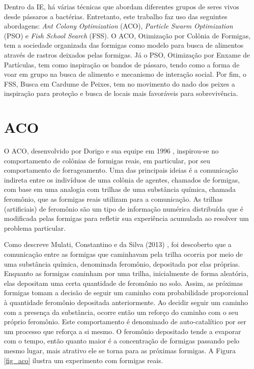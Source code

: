 Dentro da IE, há várias técnicas que abordam diferentes grupos de seres vivos desde pássaros a bactérias. Entretanto, este trabalho faz uso das seguintes abordagens: \textit{ Ant Colony Optimization} (ACO), \textit{Particle Swarm Optimization} (PSO) e \textit{Fish School Search} (FSS). O ACO, Otimização por Colônia de Formigas, tem a sociedade organizada das formigas como modelo para busca de alimentos através de rastros deixados pelas formigas. Já o PSO, Otimização por Enxame de Partículas, tem como inspiração os bandos de pássaro, tendo como a forma de voar em grupo na busca de alimento e mecanismo de interação social. Por fim, o FSS, Busca em Cardume de Peixes, tem no movimento do nado dos peixes a inspiração para proteção e busca de locais mais favoráveis para sobrevivência.

\section{ACO}
\label{sec-aco}

O ACO, desenvolvido por Dorigo e sua equipe em 1996 \cite{dorigo1996any}, inspirou-se no comportamento de colônias de formigas reais, em particular, por seu comportamento de forrageamento. Uma das principais ideias é a comunicação indireta entre os indivíduos de uma colônia de agentes, chamados de formigas, com base em uma analogia com trilhas de uma substância química, chamada feromônio, que as formigas reais utilizam para a comunicação. As trilhas (artificiais) de feromônio são um tipo de informação numérica distribuída que é modificada pelas formigas para refletir sua experiência acumulada ao resolver um problema particular.

Como descreve Mulati, Constantino e da Silva (2013) \cite{mulati2013otimizaccao}, foi descoberto que a comunicação entre as formigas que caminhavam pela trilha ocorria por meio de uma substância química, denominada feromônio, depositada por elas próprias. Enquanto as formigas caminham por uma trilha, inicialmente de forma aleatória, elas depositam uma certa quantidade de feromônio no solo. Assim, as próximas formigas tomam a decisão de seguir um caminho com probabilidade proporcional à quantidade feromônio depositada anteriormente. Ao decidir seguir um caminho com a presença da substância, ocorre então um reforço do caminho com o seu próprio feromônio. Este comportamento é denominado de auto-catalítico por ser um processo que reforça a si mesmo. O feromônio depositado tende a evaporar com o tempo, então quanto maior é a concentração de formigas passando pelo mesmo lugar, mais atrativo ele se torna para as próximas formigas. A Figura \ref{fig_aco} ilustra um experimento com formigas reais.

